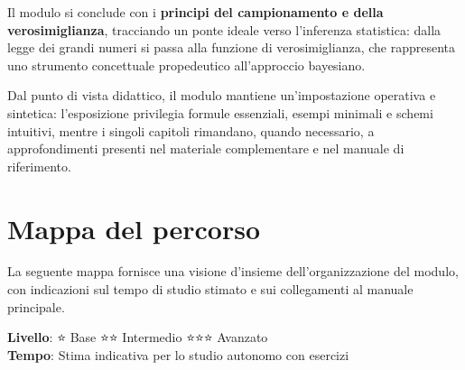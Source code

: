 \documentclass[
  italian,
  letterpaper,
  a4paper,
  11pt,
  open=any]{scrbook}
\theoremstyle{plain}
\theoremstyle{definition}
\theoremstyle{definition}
\theoremstyle{remark}
\begin{document}
Il modulo si conclude con i \textbf{principi del campionamento e della
verosimiglianza}, tracciando un ponte ideale verso l'inferenza
statistica: dalla legge dei grandi numeri si passa alla funzione di
verosimiglianza, che rappresenta uno strumento concettuale propedeutico
all'approccio bayesiano.

Dal punto di vista didattico, il modulo mantiene un'impostazione
operativa e sintetica: l'esposizione privilegia formule essenziali,
esempi minimali e schemi intuitivi, mentre i singoli capitoli rimandano,
quando necessario, a approfondimenti presenti nel materiale
complementare e nel manuale di riferimento.

\section*{Mappa del percorso}\label{mappa-del-percorso}


La seguente mappa fornisce una visione d'insieme dell'organizzazione del
modulo, con indicazioni sul tempo di studio stimato e sui collegamenti
al manuale principale.

\begin{tcolorbox}[enhanced jigsaw, arc=.35mm, bottomrule=.15mm, bottomtitle=1mm, breakable, colback=white, colbacktitle=quarto-callout-note-color!10!white, colframe=quarto-callout-note-color-frame, coltitle=black, left=2mm, leftrule=.75mm, opacityback=0, opacitybacktitle=0.6, rightrule=.15mm, title={Legenda}, titlerule=0mm, toprule=.15mm, toptitle=1mm]

\textbf{Livello}: ⭐ Base \textbar{} ⭐⭐ Intermedio \textbar{} ⭐⭐⭐
Avanzato\\
\textbf{Tempo}: Stima indicativa per lo studio autonomo con esercizi

\end{tcolorbox}
\end{document}
